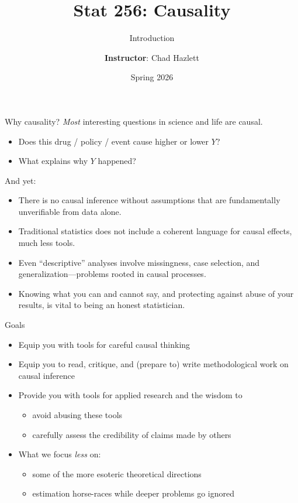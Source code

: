 \documentclass[xcolor=dvipsnames]{beamer}
\title{Stat 256: Causality}
\date{Spring 2026}
\subtitle[ ]{Introduction}
\author{\textbf{Instructor}: Chad Hazlett}
\institute[UCLA]{UCLA\\[1ex]}
\begin{document}
\begin{frame}
  \titlepage
\end{frame}


\begin{frame}{Why causality?}
 \textit{Most} interesting questions in science and life are causal. \\
\footnotesize
\begin{itemize}
\item Does this drug / policy / event cause higher or lower $Y$?
\item What explains why $Y$ happened?
\end{itemize}
\bigskip
\normalsize
{} And yet:\\
\footnotesize
\begin{itemize}
\item<3-> There is no causal inference without assumptions that are fundamentally unverifiable from data alone. \medskip
\item<4-> Traditional statistics does not include a coherent language for causal effects, much less tools. \medskip
\item<5-> Even ``descriptive'' analyses involve missingness, case selection, and generalization---problems rooted in causal processes. \medskip
\item<6-> Knowing what you can and cannot say, and protecting against abuse of your results, is vital to being an honest statistician.
\end{itemize}
\end{frame}


\begin{frame}{Goals}
\begin{itemize}
\item<1-> Equip you with tools for careful causal thinking \medskip
\item<2-> Equip you to read, critique, and (prepare to) write methodological work on causal inference \medskip
\item<3-> Provide you with tools for applied research and the wisdom to
\begin{itemize}
\item avoid abusing these tools
\item carefully assess the credibility of claims made by others
\end{itemize}
\medskip
\item<4-> What we focus \textit{less} on:
\begin{itemize}
\item some of the more esoteric theoretical directions
\item estimation horse-races while deeper problems go ignored
\end{itemize}
\end{itemize}
\end{frame}
\end{document}

